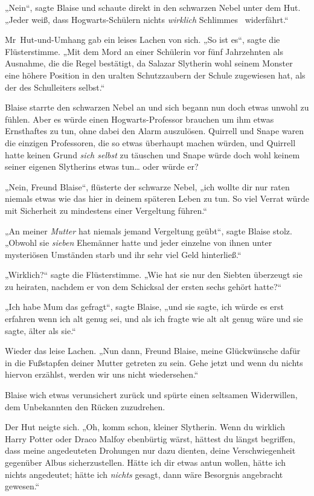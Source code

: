 {„Nein“, sagte Blaise und schaute direkt in den schwarzen Nebel unter dem Hut. „Jeder weiß, dass Hogwarts-Schülern nichts \emph{wirklich} Schlimmes ~widerfährt.“

Mr~Hut-und-Umhang gab ein leises Lachen von sich. „So ist es“, sagte die Flüsterstimme. „Mit dem Mord an einer Schülerin vor fünf Jahrzehnten als Ausnahme, die die Regel bestätigt, da Salazar Slytherin wohl seinem Monster eine höhere Position in den uralten Schutzzaubern der Schule zugewiesen hat, als der des Schulleiters selbst.“

Blaise starrte den schwarzen Nebel an und sich begann nun doch etwas unwohl zu fühlen. Aber es würde einen Hogwarts-Professor brauchen um ihm etwas Ernsthaftes zu tun, ohne dabei den Alarm auszulösen. Quirrell und Snape waren die einzigen Professoren, die so etwas überhaupt machen würden, und Quirrell hatte keinen Grund \emph{sich selbst} zu täuschen und Snape würde doch wohl keinem seiner eigenen Slytherins etwas tun… oder würde er?

„Nein, Freund Blaise“, flüsterte der schwarze Nebel, „ich wollte dir nur raten niemals etwas wie das hier in deinem späteren Leben zu tun. So viel Verrat würde mit Sicherheit zu mindestens einer Vergeltung führen.“

„An meiner \emph{Mutter} hat niemals jemand Vergeltung geübt“, sagte Blaise stolz. „Obwohl sie \emph{sieben} Ehemänner hatte und jeder einzelne von ihnen unter mysteriösen Umständen starb und ihr sehr viel Geld hinterließ.“

„Wirklich?“ sagte die Flüsterstimme. „Wie hat sie nur den Siebten überzeugt sie zu heiraten, nachdem er von dem Schicksal der ersten sechs gehört hatte?“

„Ich habe Mum das gefragt“, sagte Blaise, „und sie sagte, ich würde es erst erfahren wenn ich alt genug sei, und als ich fragte wie alt alt genug wäre und sie sagte, älter als sie.“

Wieder das leise Lachen. „Nun dann, Freund Blaise, meine Glückwünsche dafür in die Fußstapfen deiner Mutter getreten zu sein. Gehe jetzt und wenn du nichts hiervon erzählst, werden wir uns nicht wiedersehen.“

Blaise wich etwas verunsichert zurück und spürte einen seltsamen Widerwillen, dem Unbekannten den Rücken zuzudrehen.

Der Hut neigte sich. „Oh, komm schon, kleiner Slytherin. Wenn du wirklich Harry Potter oder Draco Malfoy ebenbürtig wärst, hättest du längst begriffen, dass meine angedeuteten Drohungen nur dazu dienten, deine Verschwiegenheit gegenüber Albus sicherzustellen. Hätte ich dir etwas antun wollen, hätte ich nichts angedeutet; hätte ich \emph{nichts} gesagt, dann wäre Besorgnis angebracht gewesen.“

}
